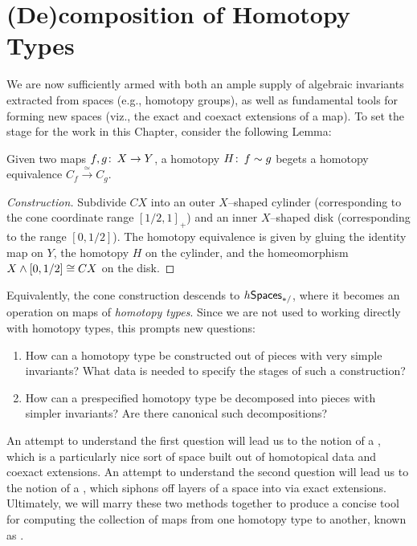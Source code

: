 
\chapter{(De)composition of Homotopy Types}

We are now sufficiently armed with both an ample supply of algebraic invariants extracted from spaces (e.g., homotopy groups), as well as fundamental tools for forming new spaces (viz., the exact and coexact extensions of a map).
To set the stage for the work in this Chapter, consider the following Lemma:

\begin{lemma}
Given two maps $f, g\colon\thinspace X \to Y$, a homotopy $H\colon\thinspace f \sim g$ begets a homotopy equivalence $C_f \xrightarrow{\simeq} C_g$.
\end{lemma}
\begin{proof}[Construction] 
Subdivide $CX$ into an outer $X$--shaped cylinder (corresponding to the cone coordinate range $[1/2, 1]_+$) and an inner $X$--shaped disk (corresponding to the range $[0, 1/2]$).
The homotopy equivalence is given by gluing the identity map on $Y$, the homotopy $H$ on the cylinder, and the homeomorphism $X \wedge [0, 1/2] \cong CX$ on the disk.
\end{proof}

Equivalently, the cone construction descends to $h\mathsf{Spaces}_{*/}$, where it becomes an operation on maps of \emph{homotopy types}.
Since we are not used to working directly with homotopy types, this prompts new questions: 
\begin{enumerate}
    \item
    How can a homotopy type be constructed out of pieces with very simple invariants?
    What data is needed to specify the stages of such a construction?
    \item
    How can a prespecified homotopy type be decomposed into pieces with simpler invariants?
    Are there canonical such decompositions?
\end{enumerate}
An attempt to understand the first question will lead us to the notion of a , which is a particularly nice sort of space built out of homotopical data and coexact extensions.
An attempt to understand the second question will lead us to the notion of a , which siphons off layers of a space into  via exact extensions.
Ultimately, we will marry these two methods together to produce a concise tool for computing the collection of maps from one homotopy type to another, known as .





